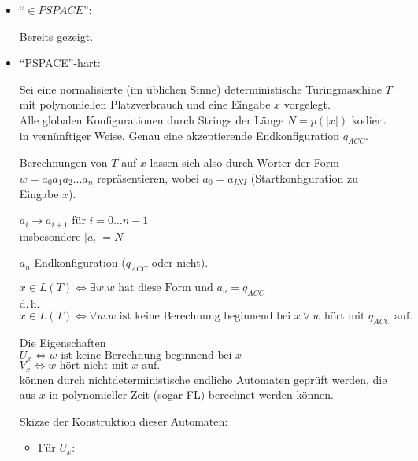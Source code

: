 \begin{beweis}

    \begin{itemize}

        \item ``$\in PSPACE$'':

        Bereits gezeigt.


        \item ``PSPACE''-hart:

        Sei eine normalisierte (im üblichen Sinne) deterministische Turingmaschine $T$ mit polynomiellen Platzverbrauch und eine Eingabe $x$ vorgelegt.
        \\
        Alle globalen Konfigurationen durch Strings der Länge $N = p(|x|)$ kodiert in vernünftiger Weise. Genau eine akzeptierende Endkonfiguration $q_{ACC}$.

        Berechnungen von $T$ auf $x$ lassen sich also durch Wörter der Form $w = a_0 a_1 a_2 \dots a_n$ repräsentieren, wobei $a_0 = a_{INI}$ (Startkonfiguration zu Eingabe $x$).

        $a_i \rightarrow a_{i+1} $ für $i = 0 \dots n-1$
        \\
        insbesondere $|a_i| = N$

        $a_n$ Endkonfiguration ($q_{ACC}$ oder nicht).

        $x \in L(T) \Leftrightarrow \exists w . w \text{ hat diese Form und } a_n = q_{ACC}$
        \\d.\,h.
        $x \in L(T) \Leftrightarrow \forall w . w \text{ ist keine Berechnung beginnend bei } x \lor w \text{ hört mit } q_{ACC} \text{ auf. }$

        Die Eigenschaften
        \\
        $U_x \Longleftrightarrow w \text{ ist keine Berechnung beginnend bei } x $
        \\
        $V_x \Longleftrightarrow w \text{ hört nicht mit } x \text{ auf. }$
        \\
        können durch nichtdeterministische endliche Automaten geprüft werden, die aus $x$ in polynomieller Zeit (sogar FL) berechnet werden können.

        Skizze der Konstruktion dieser Automaten:
        \begin{itemize}

            \item Für $U_x$:


\end{itemize}
\end{itemize}
\end{beweis}
